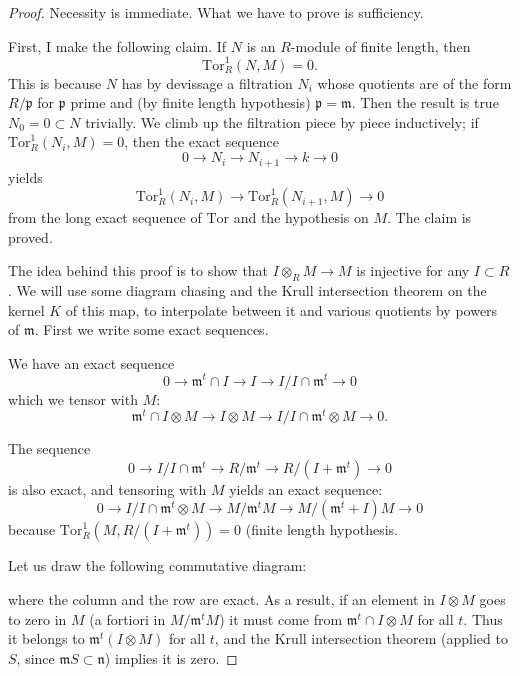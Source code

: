 \begin{proof} 
Necessity is immediate.  What we have to prove is sufficiency.

First, I make the following claim. If $N$ is an $R$-module of finite length, then
\[ \mathrm{Tor} ^1_R( N, M)=0.\]
This is because $N$ has by devissage a filtration $N_i$ whose quotients are of the form $R/\mathfrak{p}$ for $\mathfrak{p}$ prime and (by finite length hypothesis) $\mathfrak{p}= \mathfrak{m}$.  
Then the result is true $N_0=0 \subset N$ trivially.  We climb up the filtration piece by piece inductively; if $\mathrm{Tor} ^1_R(N_i, M)=0$, then the exact sequence
\[ 0 \to N_i \to N_{i+1} \to k \to 0 \]
yields
\[ \mathrm{Tor} ^1_R(N_i, M) \to \mathrm{Tor} ^1_R(N_{i+1}, M) \to 0 \]
from the long exact sequence of $\mathrm{Tor} $ and the hypothesis on $M$.
The claim is proved.


The idea behind this proof is to show that $I \otimes_RM \to M$ is injective for any $I \subset R$.  We will use some diagram chasing and the Krull intersection theorem on the kernel $K$ of this map, to interpolate between it and various quotients by powers of $\mathfrak{m}$.
First we write some exact sequences.

We have an exact sequence
\[ 0 \to \mathfrak{m}^t \cap I \to I \to I/I \cap \mathfrak{m}^t \to 0\]
which we tensor with $M$:
\[   \mathfrak{m}^t \cap I \otimes M \to I \otimes M \to I/I \cap \mathfrak{m}^t \otimes M \to 0.\]

The sequence
\[ 0 \to  I/I  \cap \mathfrak{m}^t \to R/\mathfrak{m}^t \to R/(I+\mathfrak{m}^t) \to 0\]
is also exact, and tensoring with $M$ yields an exact sequence:
\[ 0 \to  I/I  \cap \mathfrak{m}^t \otimes M  \to M/\mathfrak{m}^tM  \to M/(\mathfrak{m}^t  + I) M \to 0\]
because $\mathrm{Tor} ^1_R(M,   R/(I+\mathfrak{m}^t))=0$ (finite length hypothesis.


Let us draw the following commutative diagram:\\

where the column and the row are exact.
As a result, if an element in $I \otimes M$ goes to zero in $M$ (a fortiori in  $M/\mathfrak{m}^tM$) it must come from $\mathfrak{m}^t \cap I \otimes M$ for all $t$.  Thus it belongs to $\mathfrak{m}^t(I \otimes M)$ for all $t$, and the Krull intersection theorem (applied to $S$, since $\mathfrak{m}S \subset \mathfrak{n}$) implies it is zero.

\end{proof} 

